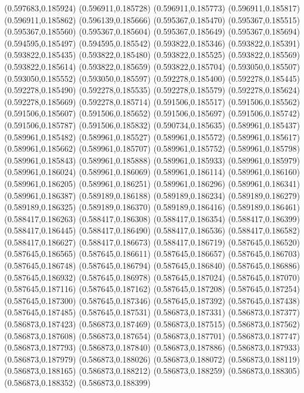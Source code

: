 (0.597683,0.185924)
(0.596911,0.185728)
(0.596911,0.185773)
(0.596911,0.185817)
(0.596911,0.185862)
(0.596139,0.185666)
(0.595367,0.185470)
(0.595367,0.185515)
(0.595367,0.185560)
(0.595367,0.185604)
(0.595367,0.185649)
(0.595367,0.185694)
(0.594595,0.185497)
(0.594595,0.185542)
(0.593822,0.185346)
(0.593822,0.185391)
(0.593822,0.185435)
(0.593822,0.185480)
(0.593822,0.185525)
(0.593822,0.185569)
(0.593822,0.185614)
(0.593822,0.185659)
(0.593822,0.185704)
(0.593050,0.185507)
(0.593050,0.185552)
(0.593050,0.185597)
(0.592278,0.185400)
(0.592278,0.185445)
(0.592278,0.185490)
(0.592278,0.185535)
(0.592278,0.185579)
(0.592278,0.185624)
(0.592278,0.185669)
(0.592278,0.185714)
(0.591506,0.185517)
(0.591506,0.185562)
(0.591506,0.185607)
(0.591506,0.185652)
(0.591506,0.185697)
(0.591506,0.185742)
(0.591506,0.185787)
(0.591506,0.185832)
(0.590734,0.185635)
(0.589961,0.185437)
(0.589961,0.185482)
(0.589961,0.185527)
(0.589961,0.185572)
(0.589961,0.185617)
(0.589961,0.185662)
(0.589961,0.185707)
(0.589961,0.185752)
(0.589961,0.185798)
(0.589961,0.185843)
(0.589961,0.185888)
(0.589961,0.185933)
(0.589961,0.185979)
(0.589961,0.186024)
(0.589961,0.186069)
(0.589961,0.186114)
(0.589961,0.186160)
(0.589961,0.186205)
(0.589961,0.186251)
(0.589961,0.186296)
(0.589961,0.186341)
(0.589961,0.186387)
(0.589189,0.186188)
(0.589189,0.186234)
(0.589189,0.186279)
(0.589189,0.186325)
(0.589189,0.186370)
(0.589189,0.186416)
(0.589189,0.186461)
(0.588417,0.186263)
(0.588417,0.186308)
(0.588417,0.186354)
(0.588417,0.186399)
(0.588417,0.186445)
(0.588417,0.186490)
(0.588417,0.186536)
(0.588417,0.186582)
(0.588417,0.186627)
(0.588417,0.186673)
(0.588417,0.186719)
(0.587645,0.186520)
(0.587645,0.186565)
(0.587645,0.186611)
(0.587645,0.186657)
(0.587645,0.186703)
(0.587645,0.186748)
(0.587645,0.186794)
(0.587645,0.186840)
(0.587645,0.186886)
(0.587645,0.186932)
(0.587645,0.186978)
(0.587645,0.187024)
(0.587645,0.187070)
(0.587645,0.187116)
(0.587645,0.187162)
(0.587645,0.187208)
(0.587645,0.187254)
(0.587645,0.187300)
(0.587645,0.187346)
(0.587645,0.187392)
(0.587645,0.187438)
(0.587645,0.187485)
(0.587645,0.187531)
(0.586873,0.187331)
(0.586873,0.187377)
(0.586873,0.187423)
(0.586873,0.187469)
(0.586873,0.187515)
(0.586873,0.187562)
(0.586873,0.187608)
(0.586873,0.187654)
(0.586873,0.187701)
(0.586873,0.187747)
(0.586873,0.187793)
(0.586873,0.187840)
(0.586873,0.187886)
(0.586873,0.187933)
(0.586873,0.187979)
(0.586873,0.188026)
(0.586873,0.188072)
(0.586873,0.188119)
(0.586873,0.188165)
(0.586873,0.188212)
(0.586873,0.188259)
(0.586873,0.188305)
(0.586873,0.188352)
(0.586873,0.188399)
